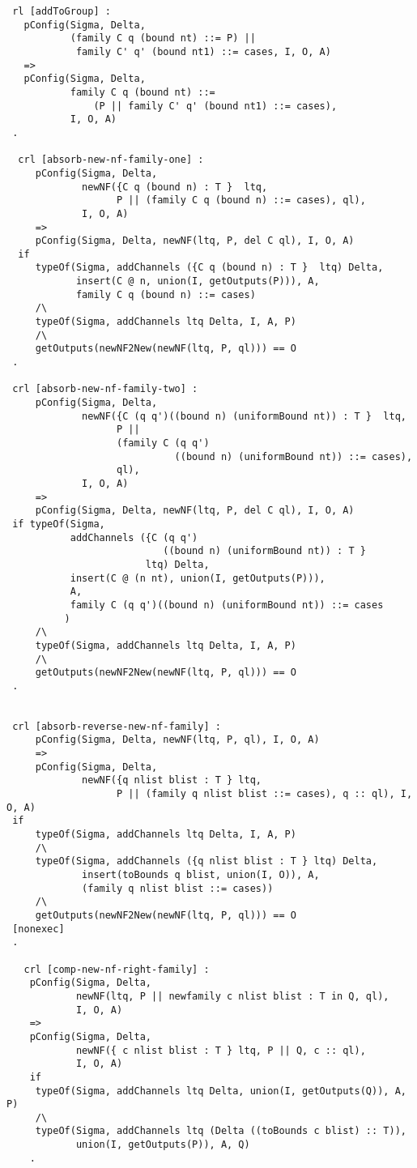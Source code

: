 \begin{lstlisting}
 rl [addToGroup] :
   pConfig(Sigma, Delta, 
           (family C q (bound nt) ::= P) || 
            family C' q' (bound nt1) ::= cases, I, O, A)
   => 
   pConfig(Sigma, Delta, 
           family C q (bound nt) ::= 
               (P || family C' q' (bound nt1) ::= cases), 
           I, O, A)
 .  
    
  crl [absorb-new-nf-family-one] : 
     pConfig(Sigma, Delta, 
             newNF({C q (bound n) : T }  ltq, 
                   P || (family C q (bound n) ::= cases), ql), 
             I, O, A) 
     => 
     pConfig(Sigma, Delta, newNF(ltq, P, del C ql), I, O, A) 
  if
     typeOf(Sigma, addChannels ({C q (bound n) : T }  ltq) Delta, 
            insert(C @ n, union(I, getOutputs(P))), A, 
            family C q (bound n) ::= cases)
     /\
     typeOf(Sigma, addChannels ltq Delta, I, A, P)       
     /\ 
     getOutputs(newNF2New(newNF(ltq, P, ql))) == O 
 .
 
 crl [absorb-new-nf-family-two] : 
     pConfig(Sigma, Delta, 
             newNF({C (q q')((bound n) (uniformBound nt)) : T }  ltq, 
                   P || 
                   (family C (q q')
                             ((bound n) (uniformBound nt)) ::= cases), 
                   ql), 
             I, O, A) 
     => 
     pConfig(Sigma, Delta, newNF(ltq, P, del C ql), I, O, A) 
 if typeOf(Sigma, 
           addChannels ({C (q q')
                           ((bound n) (uniformBound nt)) : T } 
                        ltq) Delta, 
           insert(C @ (n nt), union(I, getOutputs(P))), 
           A, 
           family C (q q')((bound n) (uniformBound nt)) ::= cases
          )
     /\
     typeOf(Sigma, addChannels ltq Delta, I, A, P)       
     /\ 
     getOutputs(newNF2New(newNF(ltq, P, ql))) == O     
 .  
 
      
 crl [absorb-reverse-new-nf-family] : 
     pConfig(Sigma, Delta, newNF(ltq, P, ql), I, O, A)
     =>
     pConfig(Sigma, Delta, 
             newNF({q nlist blist : T } ltq, 
                   P || (family q nlist blist ::= cases), q :: ql), I, O, A) 
 if   
     typeOf(Sigma, addChannels ltq Delta, I, A, P) 
     /\
     typeOf(Sigma, addChannels ({q nlist blist : T } ltq) Delta, 
             insert(toBounds q blist, union(I, O)), A,
             (family q nlist blist ::= cases)) 
     /\
     getOutputs(newNF2New(newNF(ltq, P, ql))) == O 
 [nonexec] 
 . 
     
   crl [comp-new-nf-right-family] :
    pConfig(Sigma, Delta, 
            newNF(ltq, P || newfamily c nlist blist : T in Q, ql), 
            I, O, A)
    =>
    pConfig(Sigma, Delta, 
            newNF({ c nlist blist : T } ltq, P || Q, c :: ql), 
            I, O, A) 
    if
     typeOf(Sigma, addChannels ltq Delta, union(I, getOutputs(Q)), A, P) 
     /\
     typeOf(Sigma, addChannels ltq (Delta ((toBounds c blist) :: T)),
            union(I, getOutputs(P)), A, Q) 
    .   
    

\end{lstlisting}

